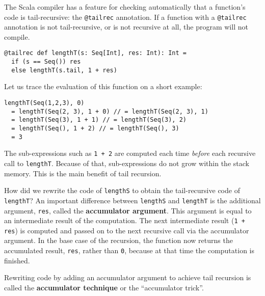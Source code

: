 The Scala compiler has a feature for checking automatically that a
function's code is tail-recursive: the \lstinline!@tailrec!
annotation. If a function with a \lstinline!@tailrec!
annotation is not tail-recursive, or is not recursive at all, the
program will not compile.
\begin{lstlisting}
@tailrec def lengthT(s: Seq[Int], res: Int): Int = 
  if (s == Seq()) res
  else lengthT(s.tail, 1 + res)
\end{lstlisting}
Let us trace the evaluation of this function on a short example:
\begin{lstlisting}
lengthT(Seq(1,2,3), 0)
  = lengthT(Seq(2, 3), 1 + 0) // = lengthT(Seq(2, 3), 1)
  = lengthT(Seq(3), 1 + 1) // = lengthT(Seq(3), 2)
  = lengthT(Seq(), 1 + 2) // = lengthT(Seq(), 3)
  = 3
\end{lstlisting}
The sub-expressions such as \lstinline!1 + 2!
are computed each time \emph{before} each recursive call to \lstinline!lengthT!.
Because of that, sub-expressions do not grow within the stack memory.
This is the main benefit of tail recursion.

How did we rewrite the code of \lstinline!lengthS!
to obtain the tail-recursive code of \lstinline!lengthT!?
An important difference between \lstinline!lengthS!
and \lstinline!lengthT!
is the additional argument, \lstinline!res!,
called the \textbf{accumulator argument}.
This argument is equal to an intermediate result of the computation.
The next intermediate result (\lstinline!1 + res!)
is computed and passed on to the next recursive call via the accumulator
argument. In the base case of the recursion, the function now returns
the accumulated result, \lstinline!res!,
rather than \lstinline!0!,
because at that time the computation is finished.

Rewriting code by adding an accumulator argument to achieve tail recursion
is called the \textbf{accumulator technique} or the ``accumulator
trick''.

